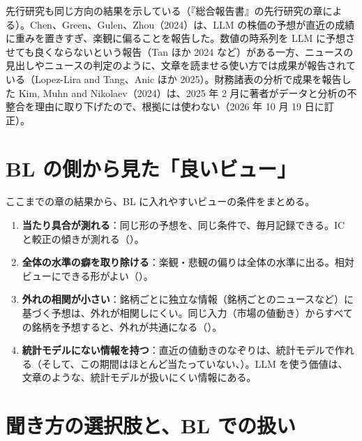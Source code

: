 先行研究も同じ方向の結果を示している（『総合報告書』の先行研究の章による）。Chen、Green、Gulen、Zhou（2024）は、LLM の株価の予想が直近の成績に重みを置きすぎ、楽観に偏ることを報告した。数値の時系列を LLM に予想させても良くならないという報告（Tan ほか 2024 など）がある一方、ニュースの見出しやニュースの判定のように、文章を読ませる使い方では成果が報告されている（Lopez-Lira and Tang、Anic ほか 2025）。財務諸表の分析で成果を報告した Kim, Muhn and Nikolaev（2024）は、2025 年 2 月に著者がデータと分析の不整合を理由に取り下げたので、根拠には使わない（2026 年 10 月 19 日に訂正）。

\section{BL の側から見た「良いビュー」}

ここまでの章の結果から、BL に入れやすいビューの条件をまとめる。

\begin{enumerate}
\item \textbf{当たり具合が測れる}：同じ形の予想を、同じ条件で、毎月記録できる。IC と較正の傾きが測れる（）。
\item \textbf{全体の水準の癖を取り除ける}：楽観・悲観の偏りは全体の水準に出る。相対ビューにできる形がよい（）。
\item \textbf{外れの相関が小さい}：銘柄ごとに独立な情報（銘柄ごとのニュースなど）に基づく予想は、外れが相関しにくい。同じ入力（市場の値動き）からすべての銘柄を予想すると、外れが共通になる（）。
\item \textbf{統計モデルにない情報を持つ}：直近の値動きのなぞりは、統計モデルで作れる（そして、この期間はほとんど当たっていない、）。LLM を使う価値は、文章のような、統計モデルが扱いにくい情報にある。
\end{enumerate}

\section{聞き方の選択肢と、BL での扱い}

